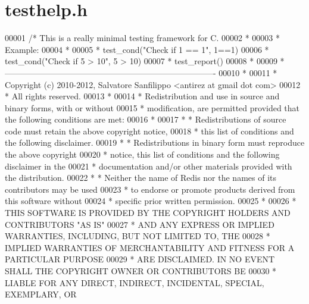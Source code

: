 \hypertarget{testhelp_8h_source}{}\section{testhelp.\+h}
\label{testhelp_8h_source}

\begin{DoxyCode}
00001 \textcolor{comment}{/* This is a really minimal testing framework for C.}
00002 \textcolor{comment}{ *}
00003 \textcolor{comment}{ * Example:}
00004 \textcolor{comment}{ *}
00005 \textcolor{comment}{ * test\_cond("Check if 1 == 1", 1==1)}
00006 \textcolor{comment}{ * test\_cond("Check if 5 > 10", 5 > 10)}
00007 \textcolor{comment}{ * test\_report()}
00008 \textcolor{comment}{ *}
00009 \textcolor{comment}{ * ----------------------------------------------------------------------------}
00010 \textcolor{comment}{ *}
00011 \textcolor{comment}{ * Copyright (c) 2010-2012, Salvatore Sanfilippo <antirez at gmail dot com>}
00012 \textcolor{comment}{ * All rights reserved.}
00013 \textcolor{comment}{ *}
00014 \textcolor{comment}{ * Redistribution and use in source and binary forms, with or without}
00015 \textcolor{comment}{ * modification, are permitted provided that the following conditions are met:}
00016 \textcolor{comment}{ *}
00017 \textcolor{comment}{ *   * Redistributions of source code must retain the above copyright notice,}
00018 \textcolor{comment}{ *     this list of conditions and the following disclaimer.}
00019 \textcolor{comment}{ *   * Redistributions in binary form must reproduce the above copyright}
00020 \textcolor{comment}{ *     notice, this list of conditions and the following disclaimer in the}
00021 \textcolor{comment}{ *     documentation and/or other materials provided with the distribution.}
00022 \textcolor{comment}{ *   * Neither the name of Redis nor the names of its contributors may be used}
00023 \textcolor{comment}{ *     to endorse or promote products derived from this software without}
00024 \textcolor{comment}{ *     specific prior written permission.}
00025 \textcolor{comment}{ *}
00026 \textcolor{comment}{ * THIS SOFTWARE IS PROVIDED BY THE COPYRIGHT HOLDERS AND CONTRIBUTORS "AS IS"}
00027 \textcolor{comment}{ * AND ANY EXPRESS OR IMPLIED WARRANTIES, INCLUDING, BUT NOT LIMITED TO, THE}
00028 \textcolor{comment}{ * IMPLIED WARRANTIES OF MERCHANTABILITY AND FITNESS FOR A PARTICULAR PURPOSE}
00029 \textcolor{comment}{ * ARE DISCLAIMED. IN NO EVENT SHALL THE COPYRIGHT OWNER OR CONTRIBUTORS BE}
00030 \textcolor{comment}{ * LIABLE FOR ANY DIRECT, INDIRECT, INCIDENTAL, SPECIAL, EXEMPLARY, OR}

\end{DoxyCode}
